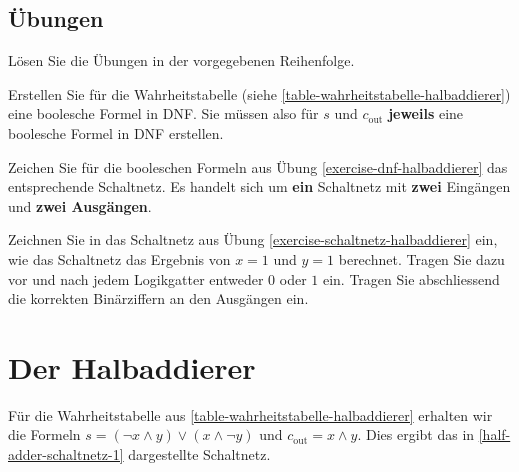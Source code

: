 \subsection{Übungen}

Lösen Sie die Übungen in der vorgegebenen Reihenfolge.

\begin{exercise}
\label{exercise-dnf-halbaddierer}
Erstellen Sie für die Wahrheitstabelle (siehe \autoref{table-wahrheitstabelle-halbaddierer}) eine boolesche Formel in \ac{DNF}. Sie müssen also für $s$ und $c_{\text{out}}$ \textbf{jeweils} eine boolesche Formel in \ac{DNF} erstellen.

\fillwithgrid{1in}
\end{exercise}

\begin{exercise}
\label{exercise-schaltnetz-halbaddierer}
Zeichen Sie für die booleschen Formeln aus Übung \ref{exercise-dnf-halbaddierer} das entsprechende Schaltnetz. Es handelt sich um \textbf{ein} Schaltnetz mit \textbf{zwei} Eingängen und \textbf{zwei Ausgängen}.

\fillwithgrid{2in}

\end{exercise}

\begin{exercise}
Zeichnen Sie in das Schaltnetz aus Übung \ref{exercise-schaltnetz-halbaddierer} ein, wie das Schaltnetz das Ergebnis von $x = 1$ und $y = 1$ berechnet. Tragen Sie dazu vor und nach jedem Logikgatter entweder $0$ oder $1$ ein. Tragen Sie abschliessend die korrekten Binärziffern an den Ausgängen ein.
\end{exercise}

\newpage

\section{Der Halbaddierer}

Für die Wahrheitstabelle aus \autoref{table-wahrheitstabelle-halbaddierer} erhalten wir die Formeln $s = (\neg x \wedge y) \vee (x \wedge \neg y)$ und $c_{\text{out}} = x \wedge y$. Dies ergibt das in \autoref{half-adder-schaltnetz-1} dargestellte Schaltnetz.

